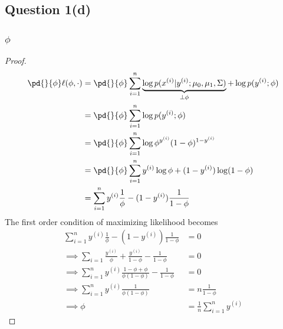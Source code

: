 \documentclass[11pt]{article}
\newcommand{\upi}[0]{^{(i)}}
\begin{document}
	\newpage
	\subsection{Question 1(d)}
	\subsubsection{$\phi$}
	\begin{proof}
	\begin{align}
		\pd{}{\phi} \ell (\phi, \cdot) &= \pd{}{\phi} \sum_{i=1}^n
		\underbrace{\log p(x\upi|y\upi; \mu_0, \mu_1, \Sigma)}_{\perp \phi}
		+ \log p(y\upi; \phi) \\
		&= \pd{}{\phi} \sum_{i=1}^n \log p(y\upi; \phi) \\
		&= \pd{}{\phi} \sum_{i=1}^n \log \phi^{y\upi} (1 - \phi)^{1 - y\upi} \\
		&= \pd{}{\phi} \sum_{i=1}^n y\upi \log \phi + (1 - y\upi) \log (1 - \phi) \\
		&= \sum_{i=1}^n y\upi \frac{1}{\phi} - (1 - y\upi) \frac{1}{1 - \phi}
	\end{align}
	The first order condition of maximizing likelihood becomes
	\begin{align}
		\sum_{i=1}^n y\upi \frac{1}{\phi} - (1 - y\upi) \frac{1}{1 - \phi} &= 0 \\
		\implies \sum_{i=1} \frac{y\upi}{\phi} + \frac{y\upi}{1 - \phi} - \frac{1}{1 - \phi} &= 0 \\
		\implies \sum_{i=1}^n y\upi \frac{1 - \phi + \phi}{\phi (1 - \phi)} - \frac{1}{1 - \phi} &= 0 \\
		\implies \sum_{i=1}^n y\upi \frac{1}{\phi (1 - \phi)} &= n \frac{1}{1-\phi} \\
		\implies \phi &= \frac{1}{n} \sum_{i=1}^n y\upi
	\end{align}
	\end{proof}
	
\end{document}
